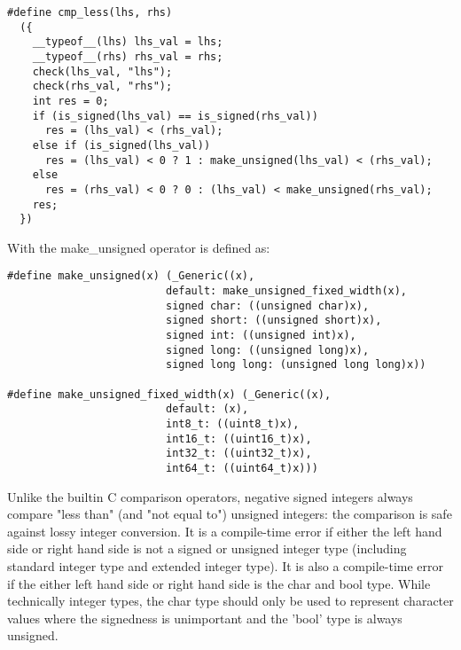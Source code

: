 \documentclass[11pt,letterpaper]{article}
\begin{document}
\begin{lstlisting}[style=CStyle]
#define cmp_less(lhs, rhs)                                                     
  ({                                                                           
    __typeof__(lhs) lhs_val = lhs;                                             
    __typeof__(rhs) rhs_val = rhs;                                             
    check(lhs_val, "lhs");                                                     
    check(rhs_val, "rhs");                                                     
    int res = 0;                                                               
    if (is_signed(lhs_val) == is_signed(rhs_val))                              
      res = (lhs_val) < (rhs_val);                                             
    else if (is_signed(lhs_val))                                               
      res = (lhs_val) < 0 ? 1 : make_unsigned(lhs_val) < (rhs_val);            
    else                                                                       
      res = (rhs_val) < 0 ? 0 : (lhs_val) < make_unsigned(rhs_val);            
    res;                                                                       
  })
\end{lstlisting}

With the make\_unsigned operator is defined as:

\begin{lstlisting}[style=CStyle]
#define make_unsigned(x) (_Generic((x), 
                         default: make_unsigned_fixed_width(x), 
                         signed char: ((unsigned char)x), 
                         signed short: ((unsigned short)x), 
                         signed int: ((unsigned int)x), 
                         signed long: ((unsigned long)x), 
                         signed long long: (unsigned long long)x))
                                          
#define make_unsigned_fixed_width(x) (_Generic((x), 
                         default: (x), 
                         int8_t: ((uint8_t)x), 
                         int16_t: ((uint16_t)x), 
                         int32_t: ((uint32_t)x), 
                         int64_t: ((uint64_t)x)))
\end{lstlisting}


Unlike the builtin C comparison operators, negative signed integers always compare "less than" (and "not equal to") unsigned integers: the comparison is safe against lossy integer conversion. It is a compile-time error if either the left hand side or right hand side is not a signed or unsigned integer type (including standard integer type and extended integer type). It is also a compile-time error if the either left hand side or right hand side is the char and bool type. While technically integer types, the char type should only be used to represent character values where the signedness is unimportant and the 'bool' type is always unsigned.
\end{document}
